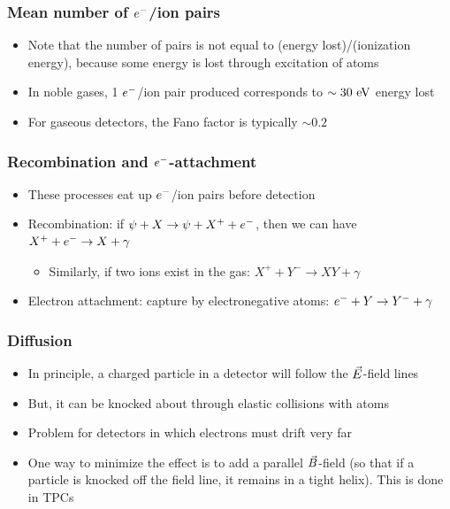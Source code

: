 \subsubsection{Mean number of $e^{-}$/ion pairs}
\begin{itemize}
  \item Note that the number of pairs is not equal to (energy lost)/(ionization energy), because some energy is lost through excitation of atoms
  \item In noble gases, 1 $e^{-}$/ion pair produced corresponds to $\sim30~\text{eV}$ energy lost
  \item For gaseous detectors, the Fano factor is typically $\sim 0.2$
\end{itemize}
\subsubsection{Recombination and $e^{-}$-attachment}
\begin{itemize}
  \item These processes eat up $e^{-}$/ion pairs before detection
  \item Recombination: if $\psi+X\rightarrow \psi+X^++e^{-}$, then we can have $X^++e^{-} \rightarrow X+\gamma$
  \begin{itemize}
    \item Similarly, if two ions exist in the gas: $X^++Y^- \rightarrow XY+\gamma$
  \end{itemize}
  \item Electron attachment: capture by electronegative atoms: $e^{-}+Y \rightarrow Y^- + \gamma$
\end{itemize}
\subsubsection{Diffusion}
\begin{itemize}
  \item In principle, a charged particle in a detector will follow the $\vec{E}$-field lines
  \item But, it can be knocked about through elastic collisions with atoms
  \item Problem for detectors in which electrons must drift very far
  \item One way to minimize the effect is to add a parallel $\vec{B}$-field (so that if a particle is knocked off the field line, it remains in a tight helix). This is done in TPCs
\end{itemize}

